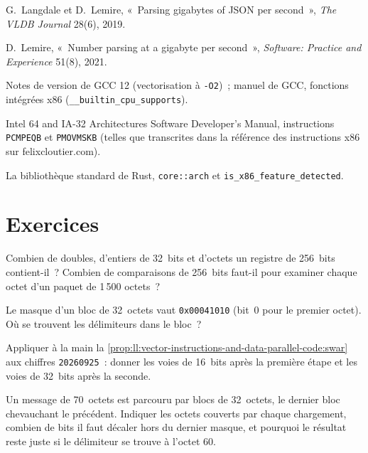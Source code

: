 \begin{omsources} \sloppy
\item G.~Langdale et D.~Lemire, «~Parsing gigabytes of JSON per second~», \emph{The VLDB Journal} 28(6), 2019.
\item D.~Lemire, «~Number parsing at a gigabyte per second~», \emph{Software: Practice and Experience} 51(8), 2021.
\item Notes de version de GCC 12 (vectorisation à \texttt{-O2})~; manuel de GCC, fonctions intégrées x86
(\texttt{\_\_builtin\_cpu\_supports}).
\item Intel 64 and IA-32 Architectures Software Developer's Manual, instructions \texttt{PCMPEQB} et \texttt{PMOVMSKB} (telles
que transcrites dans la référence des instructions x86 sur felixcloutier.com).
\item La bibliothèque standard de Rust, \texttt{core::arch} et \texttt{is\_x86\_feature\_detected}.
\end{omsources}

\section{Exercices}

\begin{exercise}[$\star$]\label{exo:ll:vector-instructions-and-data-parallel-code:1}
Combien de doubles, d'entiers de 32~bits et d'octets un registre de 256~bits contient-il~? Combien de comparaisons de 256~bits faut-il pour
examiner chaque octet d'un paquet de 1\,500 octets~?
\end{exercise}

\begin{exercise}[$\star$]\label{exo:ll:vector-instructions-and-data-parallel-code:2}
Le masque d'un bloc de 32~octets vaut \texttt{0x00041010} (bit~0 pour le premier octet). Où se trouvent les délimiteurs dans le bloc~?
\end{exercise}

\begin{exercise}[$\star$]\label{exo:ll:vector-instructions-and-data-parallel-code:3}
Appliquer à la main la \cref{prop:ll:vector-instructions-and-data-parallel-code:swar} aux chiffres \texttt{20260925}~: donner les
voies de 16~bits après la première étape et les voies de 32~bits après la seconde.
\end{exercise}

\begin{exercise}[$\star\star$]\label{exo:ll:vector-instructions-and-data-parallel-code:4}
Un message de 70~octets est parcouru par blocs de 32~octets, le dernier bloc chevauchant le précédent. Indiquer les octets couverts par chaque chargement, combien
de bits il faut décaler hors du dernier masque, et pourquoi le résultat reste juste si le délimiteur se trouve à l'octet 60.
\end{exercise}

